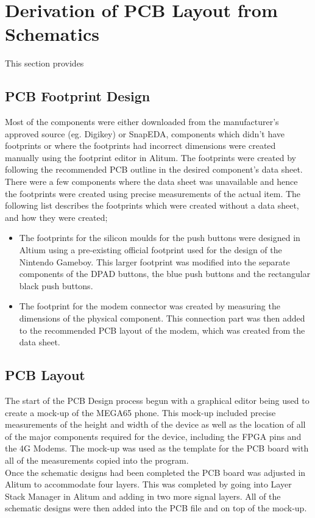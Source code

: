 
\chapter{Derivation of PCB Layout from Schematics} %

\label{Chapter6} %

This section provides
\section{PCB Footprint Design}

	Most of the components were either downloaded from the manufacturer's approved source (eg. Digikey) or SnapEDA, components which didn't have footprints or where the footprints had incorrect dimensions were created manually using the footprint editor in Alitum. The footprints were created by following the recommended PCB outline in the desired component's data sheet. There were a few components where the data sheet was unavailable and hence the footprints were created using precise measurements of the actual item. The following list describes the footprints which were created without a data sheet, and how they were created;

\begin{itemize}
\item The footprints for the silicon moulds for the push buttons were designed in Altium using a pre-existing official footprint used for the design of the Nintendo Gameboy. This larger footprint was modified into the separate components of the DPAD buttons, the blue push buttons and the rectangular black push buttons.
\item The footprint for the modem connector was created by measuring the dimensions of the physical component. This connection part was then added to the recommended PCB layout of the modem, which was created from the data sheet. 
\end{itemize}

\section{PCB Layout}

	The start of the PCB Design process begun with a graphical editor being used to create a mock-up of the MEGA65 phone. This mock-up included precise measurements of the height and width of the device as well as the location of all of the major components required for the device, including the FPGA pins and the 4G Modems. The mock-up was used as the template for the PCB board with all of the measurements copied into the program. \\
	Once the schematic designs had been completed the PCB board was adjusted in Alitum to accommodate four layers. This was completed by going into Layer Stack Manager in Alitum and adding in two more signal layers. All of the schematic designs were then added into the PCB file and on top of the mock-up. 

